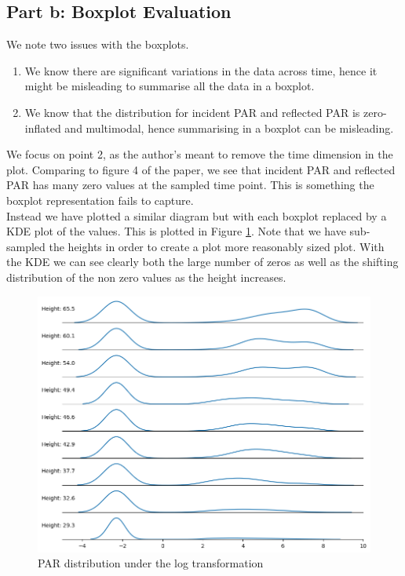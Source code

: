 \documentclass[11pt, letterpaper]{article}
\begin{document}
\subsection{Part b: Boxplot Evaluation}
We note two issues with the boxplots.
\begin{enumerate}
    \item We know there are significant variations in the data across time, hence it might be misleading to summarise all the data in a boxplot.
    \item We know that the distribution for incident PAR and reflected PAR is zero-inflated and multimodal, hence summarising in a boxplot can be misleading.
\end{enumerate}
We focus on point 2, as the author's meant to remove the time dimension in the plot. Comparing to figure 4 of the paper, we see that incident PAR and reflected PAR has many zero values at the sampled time point. This is something the boxplot representation fails to capture. \\
Instead we have plotted a similar diagram but with each boxplot replaced by a KDE plot of the values. This is plotted in Figure \ref{fig:graph_crtique_b}. Note that we have sub-sampled the heights in order to create a plot more reasonably sized plot. With the KDE we can see clearly both the large number of zeros as well as the shifting distribution of the non zero values as the height increases.
\begin{figure}[h!]
\centering
\includegraphics[width=1.0\textwidth]{Report Images/Fig7_graph_criqitue_bv2.png}
\caption{PAR distribution under the log transformation}
\label{fig:graph_crtique_b}
\end{figure}
\\
\end{document}
